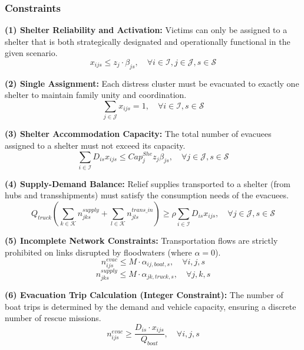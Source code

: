 \subsubsection{Constraints}

\textbf{(1) Shelter Reliability and Activation:}
Victims can only be assigned to a shelter that is both strategically designated and operationally functional in the given scenario.
\begin{equation}
x_{ijs} \le z_j \cdot \beta_{js}, \quad \forall i \in \mathcal{I}, j \in \mathcal{J}, s \in \mathcal{S}
\end{equation}

\textbf{(2) Single Assignment:}
Each distress cluster must be evacuated to exactly one shelter to maintain family unity and coordination.
\begin{equation}
\sum_{j \in \mathcal{J}} x_{ijs} = 1, \quad \forall i \in \mathcal{I}, s \in \mathcal{S}
\end{equation}

\textbf{(3) Shelter Accommodation Capacity:}
The total number of evacuees assigned to a shelter must not exceed its capacity.
\begin{equation}
\sum_{i \in \mathcal{I}} D_{is} x_{ijs} \le Cap_j^{She} z_j \beta_{js}, \quad \forall j \in \mathcal{J}, s \in \mathcal{S}
\end{equation}

\textbf{(4) Supply-Demand Balance:}
Relief supplies transported to a shelter (from hubs and transshipments) must satisfy the consumption needs of the evacuees.
\begin{equation}
Q_{truck} \left( \sum_{k \in \mathcal{K}} n_{jks}^{supply} + \sum_{l \in \mathcal{K}} n_{jls}^{trans\_in} \right) \ge \rho \sum_{i \in \mathcal{I}} D_{is} x_{ijs}, \quad \forall j \in \mathcal{J}, s \in \mathcal{S}
\end{equation}

\textbf{(5) Incomplete Network Constraints:}
Transportation flows are strictly prohibited on links disrupted by floodwaters (where $\alpha = 0$).
\begin{equation}
n_{ijs}^{evac} \le M \cdot \alpha_{ij,boat,s}, \quad \forall i, j, s
\end{equation}
\begin{equation}
n_{jks}^{supply} \le M \cdot \alpha_{jk,truck,s}, \quad \forall j, k, s
\end{equation}

\textbf{(6) Evacuation Trip Calculation (Integer Constraint):}
The number of boat trips is determined by the demand and vehicle capacity, ensuring a discrete number of rescue missions.
\begin{equation}
n_{ijs}^{evac} \ge \frac{D_{is} \cdot x_{ijs}}{Q_{boat}}, \quad \forall i, j, s
\end{equation}


